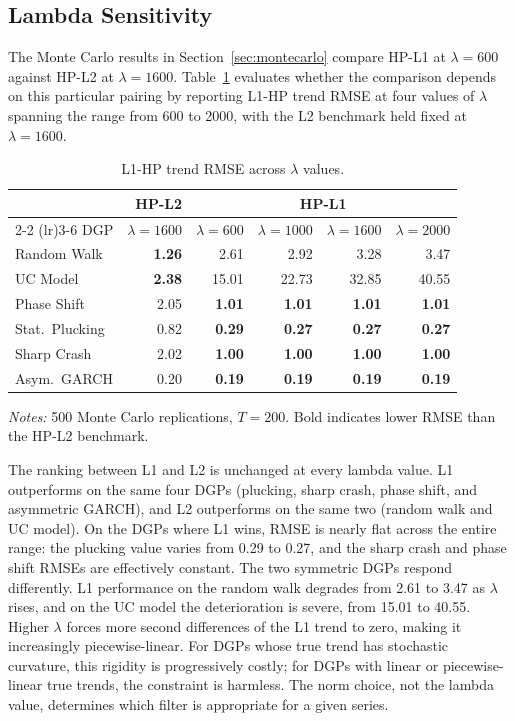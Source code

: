 \documentclass[10pt]{article}
\begin{document}
\subsection{Lambda Sensitivity}
\label{app:lambda_sensitivity}

The Monte Carlo results in Section~\ref{sec:montecarlo} compare HP-L1 at $\lambda = 600$ against HP-L2 at $\lambda = 1600$. Table~\ref{tab:lambda_sweep} evaluates whether the comparison depends on this particular pairing by reporting L1-HP trend RMSE at four values of $\lambda$ spanning the range from 600 to 2000, with the L2 benchmark held fixed at $\lambda = 1600$.

\begin{table}[htbp]
\centering
\caption{L1-HP trend RMSE across $\lambda$ values.}
\label{tab:lambda_sweep}
\begin{tabular}{l r rrrr}
\toprule
& HP-L2 & \multicolumn{4}{c}{HP-L1} \\
\cmidrule(lr){2-2} \cmidrule(lr){3-6}
DGP & $\lambda = 1600$ & $\lambda = 600$ & $\lambda = 1000$ & $\lambda = 1600$ & $\lambda = 2000$ \\
\midrule
Random Walk     & \textbf{1.26} &  2.61 &  2.92 &  3.28 &  3.47 \\
UC Model        & \textbf{2.38} & 15.01 & 22.73 & 32.85 & 40.55 \\
Phase Shift     &  2.05 & \textbf{1.01} & \textbf{1.01} & \textbf{1.01} & \textbf{1.01} \\
\midrule
Stat.\ Plucking &  0.82 & \textbf{0.29} & \textbf{0.27} & \textbf{0.27} & \textbf{0.27} \\
Sharp Crash     &  2.02 & \textbf{1.00} & \textbf{1.00} & \textbf{1.00} & \textbf{1.00} \\
Asym.\ GARCH    &  0.20 & \textbf{0.19} & \textbf{0.19} & \textbf{0.19} & \textbf{0.19} \\
\bottomrule
\end{tabular}
\begin{tablenotes}
\small
\item \textit{Notes:} 500 Monte Carlo replications, $T = 200$. Bold indicates lower RMSE than the HP-L2 benchmark.
\end{tablenotes}
\end{table}

The ranking between L1 and L2 is unchanged at every lambda value. L1 outperforms on the same four DGPs (plucking, sharp crash, phase shift, and asymmetric GARCH), and L2 outperforms on the same two (random walk and UC model). On the DGPs where L1 wins, RMSE is nearly flat across the entire range: the plucking value varies from 0.29 to 0.27, and the sharp crash and phase shift RMSEs are effectively constant. The two symmetric DGPs respond differently. L1 performance on the random walk degrades from 2.61 to 3.47 as $\lambda$ rises, and on the UC model the deterioration is severe, from 15.01 to 40.55. Higher $\lambda$ forces more second differences of the L1 trend to zero, making it increasingly piecewise-linear. For DGPs whose true trend has stochastic curvature, this rigidity is progressively costly; for DGPs with linear or piecewise-linear true trends, the constraint is harmless. The norm choice, not the lambda value, determines which filter is appropriate for a given series.
\end{document}
